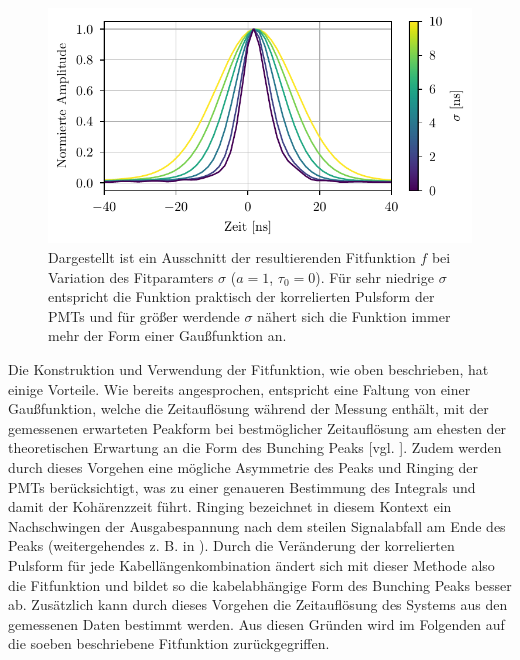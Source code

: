 \begin{figure}[h]
    \centering
    \includegraphics{images/Analysis/corr_pulses_diff_sigma.pdf}
    \caption{Dargestellt ist ein Ausschnitt der resultierenden Fitfunktion $f$ bei Variation des Fitparamters $\sigma$ ($a=1$, $\tau_0=0$). Für sehr niedrige $\sigma$ entspricht die Funktion praktisch der korrelierten Pulsform der PMTs und für größer werdende $\sigma$ nähert sich die Funktion immer mehr der Form einer Gaußfunktion an.}
    \label{fig:Fitfuktion für verschiedene sigma}
\end{figure}

Die Konstruktion und Verwendung der Fitfunktion, wie oben beschrieben, hat einige Vorteile. 
Wie bereits angesprochen, entspricht eine Faltung von einer Gaußfunktion, welche die Zeitauflösung während der Messung enthält, mit der gemessenen erwarteten Peakform bei bestmöglicher Zeitauflösung am ehesten der theoretischen Erwartung an die Form des Bunching Peaks [vgl. \cite{lasseguesFieldIntensityCorrelations2022}]. 
Zudem werden durch dieses Vorgehen eine mögliche Asymmetrie des Peaks und Ringing der PMTs berücksichtigt, was zu einer genaueren Bestimmung des Integrals und damit der Kohärenzzeit führt. 
Ringing bezeichnet in diesem Kontext ein Nachschwingen der Ausgabespannung nach dem steilen Signalabfall am Ende des Peaks (weitergehendes z. B. in \cite{HamamatsuPhotonicsPMT}). 
Durch die Veränderung der korrelierten Pulsform für jede Kabellängenkombination ändert sich mit dieser Methode also die Fitfunktion und bildet so die kabelabhängige Form des Bunching Peaks besser ab. 
Zusätzlich kann durch dieses Vorgehen die Zeitauflösung des Systems aus den gemessenen Daten bestimmt werden. 
Aus diesen Gründen wird im Folgenden auf die soeben beschriebene Fitfunktion zurückgegriffen. 

